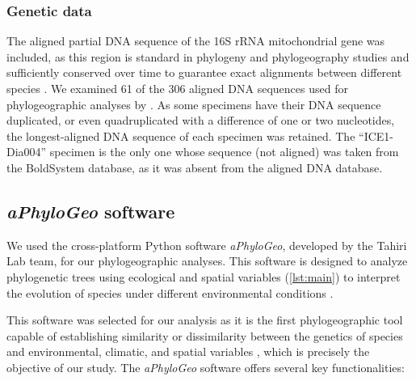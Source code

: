 \subsubsection{Genetic data}
The aligned partial DNA sequence of the 16S rRNA mitochondrial gene was included, as this region is standard in phylogeny and phylogeography studies \citep{hugenholtz1998impact} and sufficiently conserved over time to guarantee exact alignments between different species \citep{saccone1999evolutionary}. We examined 61 of the 306 aligned DNA sequences used for phylogeographic analyses by \citep{uhlir_adding_2021}. As some specimens have their DNA sequence duplicated, or even quadruplicated with a difference of one or two nucleotides, the longest-aligned DNA sequence of each specimen was retained. The ``ICE1-Dia004'' specimen is the only one whose sequence (not aligned) was taken from the BoldSystem database, as it was absent from the \citep{uhlir_adding_2021} aligned DNA database.

\subsection{{\textit{aPhyloGeo} software}\label{aPhyloGeo-software}}
We used the cross-platform Python software \textit{aPhyloGeo}, developed by the Tahiri Lab team, for our phylogeographic analyses. This software is designed to analyze phylogenetic trees using ecological and spatial variables (\autoref{lst:main}) to interpret the evolution of species under different environmental conditions \citep{koshkarov_phylogeography_2022, li2023aphylogeo, li2024host}.

This software was selected for our analysis as it is the first phylogeographic tool capable of establishing similarity or dissimilarity between the genetics of species and environmental, climatic, and spatial variables \citep{koshkarov_phylogeography_2022, li2023aphylogeo, li2024host}, which is precisely the objective of our study. The \textit{aPhyloGeo} software offers several key functionalities:

